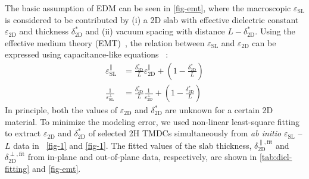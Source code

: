 The basic assumption of EDM can be seen in \autoref{fig-emt},
where the macroscopic $\varepsilon_{\mathrm{SL}}$ is considered to be
contributed by (i) a 2D slab with effective dielectric constant
$\varepsilon_{\mathrm{2D}}$ and thickness $\delta^{*}_{\mathrm{2D}}$
and (ii) vacuum spacing with distance
$L-\delta^{*}_{\mathrm{2D}}$. Using the effective medium theory
(EMT)~\autocite{Aspnes_1982_EMT,Markel_2016_EMT}, the relation between
$\varepsilon_{\mathrm{SL}}$ and $\varepsilon_{\mathrm{2D}}$ can be
expressed using capacitance-like
equations~\autocite{Matthes_2016_effective_PRB,Laturia_2018_2D_eps} :
\begin{subequations}
  \begin{eqnarray}
    \label{eq:diele-emt-1}
    {\displaystyle \varepsilon_{\mathrm{SL}}^{\parallel}} &= {\displaystyle \frac{\delta^{*}_{\mathrm{2D}}}{L} \varepsilon_{\mathrm{2D}}^{\parallel} + \left(1 - \frac{\delta^{*}_{\mathrm{2D}}}{L} \right)}\\
     \label{eq:diele-emt-2}
    {\displaystyle \frac{1}{\varepsilon_{\mathrm{SL}}^{\perp}}} &= {\displaystyle \frac{\delta^{*}_{\mathrm{2D}}}{L} \frac{1}{\varepsilon_{\mathrm{2D}}^{\perp}} + \left(1 - \frac{\delta^{*}_{\mathrm{2D}}}{L} \right)}
  \end{eqnarray}
\end{subequations}
In principle, both the values of $\varepsilon_{\mathrm{2D}}$ and
$\delta^{*}_{\mathrm{2D}}$ are unknown for a certain 2D material. To
minimize the modeling error, we used non-linear least-square fitting
to extract $\varepsilon_{\mathrm{2D}}$ and $\delta^{*}_{\mathrm{2D}}$
of selected 2H TMDCs simultaneously from \textit{ab initio}
$\varepsilon_{\mathrm{SL}}$ -- $L$ data in ~\autoref{fig-1} and
\autoref{fig-1}. The fitted values of the slab thickness,
$\delta_{\mathrm{2D}}^{\parallel, \mathrm{fit}}$ and
$\delta_{\mathrm{2D}}^{\perp, \mathrm{fit}}$ from in-plane and
out-of-plane data, respectively, are shown in
\autoref{tab:diel-fitting} and \autoref{fig-emt}.

